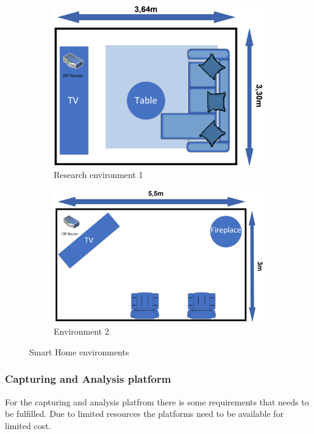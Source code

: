 \begin{figure}[H]
    \centering
    \begin{subfigure}[b]{0.80\textwidth}
        \includegraphics[width=\textwidth]{figures/Environment1.png}
        \caption{Research environment 1}
        \label{fig:Environment1}
    \end{subfigure}
    \hfill
    \begin{subfigure}[b]{0.80\textwidth}
        \includegraphics[width=\textwidth]{figures/Environment2.png}
        \caption{Environment 2}
        \label{fig:Environmet2}
    \end{subfigure}
    \caption{Smart Home environments }
    \label{fig:SmartHomeEnvironments}
\end{figure}

\subsubsection{Capturing and Analysis platform}
For the capturing and analysis platfrom there is some requirements that needs to be fulfilled. Due to limited resources the platforms need to be available for limited cost. 

